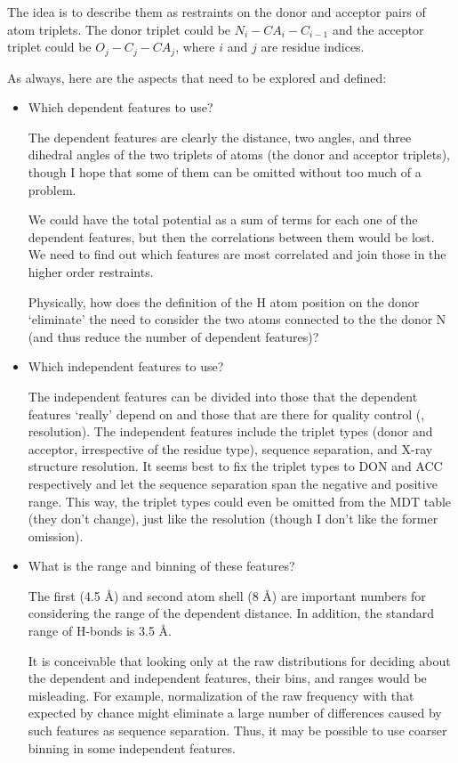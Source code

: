 The idea is to describe them as restraints on the donor and acceptor pairs of atom triplets.
The donor triplet could be $N_i - CA_{i} - C_{i-1}$ and the acceptor triplet could be 
$O_j - C_j - CA_j$, where $i$ and $j$ are residue indices.

As always, here are the aspects that need to be explored and defined:
\begin{itemize}
\item Which dependent features to use? 

The dependent features are clearly the distance, two angles, and three dihedral 
angles of the two triplets of atoms (the donor and acceptor triplets), though I hope that 
some of them can be omitted without too much of a problem. 

We could have the total potential as a sum of terms for each one of the dependent 
features, but then the correlations between them would be lost. We need to find
out which features are most correlated and join those in the higher order
restraints.

Physically, how does the definition of the H atom position on the donor `eliminate' 
the need to consider the two atoms connected to the the donor N (and thus reduce
the number of dependent features)?

\item Which independent features to use? 

The independent features can be divided into those that the dependent features `really'
depend on and those that are there for quality control (\eg, resolution). 
The independent features include the triplet types (donor and acceptor, 
irrespective of the residue type), sequence separation, and X-ray 
structure resolution. It seems best to fix the triplet types to DON and ACC
respectively and let the sequence separation span the negative and positive range.
This way, the triplet types could even be omitted from the MDT table (they don't 
change), just like the resolution (though I don't like the former omission).

\item What is the range and binning of these features?

The first (4.5 \AA) and second atom shell (8 \AA) are important numbers for considering
the range of the dependent distance. In addition, the standard range of H-bonds
is 3.5 \AA.

It is conceivable that looking only at the raw distributions for deciding about 
the dependent and independent features, their bins, and ranges would be misleading.
For example, normalization of the raw frequency with that expected by chance might
eliminate a large number of differences caused by such features as sequence
separation. Thus, it may be possible to use coarser binning in some independent
features. 


\end{itemize}
